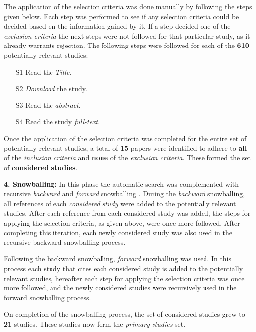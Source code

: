 The application of the selection criteria was done manually by following the steps given below. 
Each step was performed to see if any selection criteria could be decided based on the information gained by it. 
If a step decided one of the \textit{exclusion criteria} the next steps were not followed for that particular study, 
as it already warrants rejection. 
The following steps were followed for each of the \textbf{610} potentially relevant studies:
\begin{itemize}
	\item[S1] Read the \textit{Title}.
	\item[S2] \textit{Download} the study.
	\item[S3] Read the \textit{abstract}.
	\item[S4] Read the study \textit{full-text}.
\end{itemize}

Once the application of the selection criteria was completed for the entire set of potentially relevant studies,
a total of \textbf{15} papers were identified to adhere to \textbf{all} of the \textit{inclusion criteria} and
\textbf{none} of the \textit{exclusion criteria}. These formed the set of \textbf{considered studies}.

\vspace{5mm}

\noindent\textbf{4. Snowballing:}
In this phase the automatic search was complemented with recursive \textit{backward} and \textit{forward} snowballing \cite{wohlin2014snowballing}.
During the \textit{backward} snowballing, all references of each \textit{considered study} were added to the potentially relevant studies. 
After each reference from each considered study was added, the steps for applying the selection criteria, as given above, were once more followed. 
After completing this iteration, each newly considered study was also used in the recursive backward snowballing process.

Following the backward snowballing, \textit{forward} snowballing was used. 
In this process each study that cites each considered study is added to the potentially relevant studies, hereafter each step for applying the selection criteria was once more followed, and the newly considered studies were recursively used in the forward snowballing process.

\vspace{5mm}

On completion of the snowballing process, the set of considered studies grew to \textbf{21} studies. These studies now form the \textit{primary studies} set.

